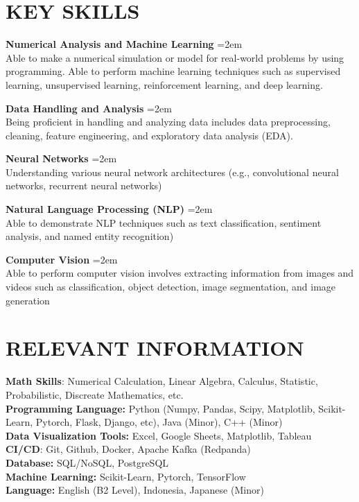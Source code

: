 \documentclass[paper=a4,fontsize=10pt]{scrartcl} %
\newcommand{\sepspace}{\vspace*{1em}}		%
\newcommand{\NewPart}[1]{\section*{\uppercase{#1}}}
\newcommand{\KerjaEntry}[2]{
		\noindent \textbf{#1} \hfill      %
		\noindent\hangindent=2em\hangafter=0 \small #2 %
		\normalsize \par}
\begin{document}
\NewPart{KEY Skills}{}

\KerjaEntry{Numerical Analysis and Machine Learning}{\\Able to make a numerical simulation or model for real-world problems by using programming. Able to perform machine learning techniques such as supervised learning, unsupervised learning, reinforcement learning, and deep learning.
}

\sepspace

\KerjaEntry{Data Handling and Analysis}{\\ Being proficient in handling and analyzing data includes data preprocessing, cleaning, feature engineering, and exploratory data analysis (EDA).
}

\sepspace

\KerjaEntry{Neural Networks}{\\ Understanding various neural network architectures (e.g., convolutional neural networks, recurrent neural networks)

\sepspace

\KerjaEntry{Natural Language Processing (NLP)}{\\ Able to demonstrate NLP techniques such as text classification, sentiment analysis, and named entity recognition)
}

\sepspace

\KerjaEntry{Computer Vision}{\\ Able to perform computer vision involves extracting information from images and videos such as classification, object detection, image segmentation, and image generation
}
}
\NewPart{RELEVANT INFORMATION}{}
\textbf{Math Skills}: Numerical Calculation, Linear Algebra, Calculus, Statistic, Probabilistic, Discreate Mathematics, etc.\\
\textbf{Programming Language:} Python (Numpy, Pandas, Scipy, Matplotlib, Scikit-Learn, Pytorch, Flask, Django, etc), Java (Minor), C++ (Minor)\\
\textbf{Data Visualization Tools:}  Excel, Google Sheets, Matplotlib, Tableau\\
\textbf{CI/CD}: Git, Github, Docker, Apache Kafka (Redpanda) \\
\textbf{Database:} SQL/NoSQL, PostgreSQL \\
\textbf{Machine Learning:} Scikit-Learn, Pytorch, TensorFlow\\
\textbf{Language:} English (B2 Level), Indonesia, Japanese (Minor) \\
\end{document}
